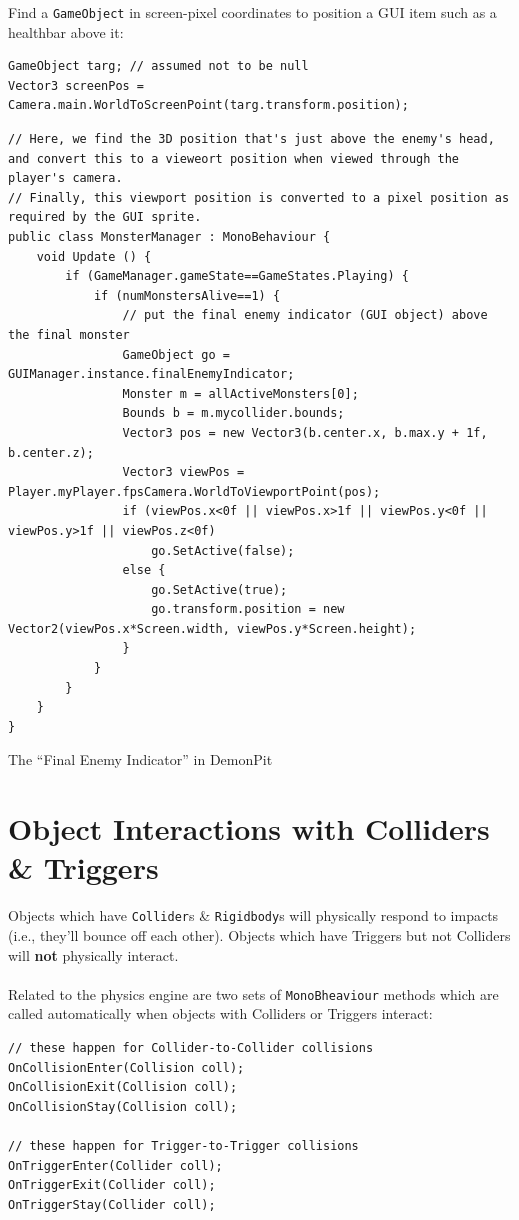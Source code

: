 \documentclass[a4paper,11pt]{article}
\newenvironment{code}{\captionsetup{type=listing}}{}
\begin{document}
Find a \verb|GameObject| in screen-pixel coordinates to position a GUI item such as a healthbar above it:
\begin{verbatim}
GameObject targ; // assumed not to be null
Vector3 screenPos = Camera.main.WorldToScreenPoint(targ.transform.position);
\end{verbatim}

\begin{code}
\begin{verbatim}
// Here, we find the 3D position that's just above the enemy's head, and convert this to a vieweort position when viewed through the player's camera.
// Finally, this viewport position is converted to a pixel position as required by the GUI sprite.
public class MonsterManager : MonoBehaviour {
    void Update () {
        if (GameManager.gameState==GameStates.Playing) {
            if (numMonstersAlive==1) {
                // put the final enemy indicator (GUI object) above the final monster
                GameObject go = GUIManager.instance.finalEnemyIndicator;
                Monster m = allActiveMonsters[0];
                Bounds b = m.mycollider.bounds;
                Vector3 pos = new Vector3(b.center.x, b.max.y + 1f, b.center.z);
                Vector3 viewPos = Player.myPlayer.fpsCamera.WorldToViewportPoint(pos);
                if (viewPos.x<0f || viewPos.x>1f || viewPos.y<0f || viewPos.y>1f || viewPos.z<0f)
                    go.SetActive(false);
                else { 
                    go.SetActive(true);
                    go.transform.position = new Vector2(viewPos.x*Screen.width, viewPos.y*Screen.height);
                }
            }
        }
    }
}
\end{verbatim}
\caption{The ``Final Enemy Indicator'' in DemonPit}
\end{code}

\section{Object Interactions with Colliders \& Triggers}
Objects which have \verb|Collider|s \& \verb|Rigidbody|s will physically respond to impacts (i.e., they'll bounce off each
other). 
Objects which have Triggers but not Colliders will \textbf{not} physically interact. 
\\\\ 
Related to the physics engine are two sets of \verb|MonoBheaviour| methods which are called automatically when objects 
with Colliders or Triggers interact: 
\begin{verbatim}
// these happen for Collider-to-Collider collisions
OnCollisionEnter(Collision coll);
OnCollisionExit(Collision coll);
OnCollisionStay(Collision coll);

// these happen for Trigger-to-Trigger collisions
OnTriggerEnter(Collider coll);
OnTriggerExit(Collider coll);
OnTriggerStay(Collider coll);
\end{verbatim}
\end{document}
